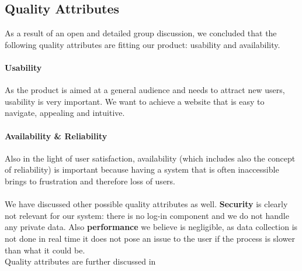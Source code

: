 \documentclass{article}
\begin{document}
\subsection{Quality Attributes}
As a result of an open and detailed group discussion, we concluded that the following quality attributes are fitting our product: usability and availability.
\paragraph{Usability}
As the product is aimed at a general audience and needs to attract new users, usability is very important. We want to achieve a website that is easy to navigate, appealing and intuitive.
\paragraph{Availability \& Reliability}
Also in the light of user satisfaction, availability (which includes also the concept of reliability) is important because having a system that is often inaccessible brings to frustration and therefore loss of users.\\\\
We have discussed other possible quality attributes as well. \textbf{Security} is clearly not relevant for our system: there is no log-in component and we do not handle any private data. Also \textbf{performance} we believe is negligible, as data collection is not done in real time it does not pose an issue to the user if the process is slower than what it could be.\\
Quality attributes are further discussed in %
\end{document}

